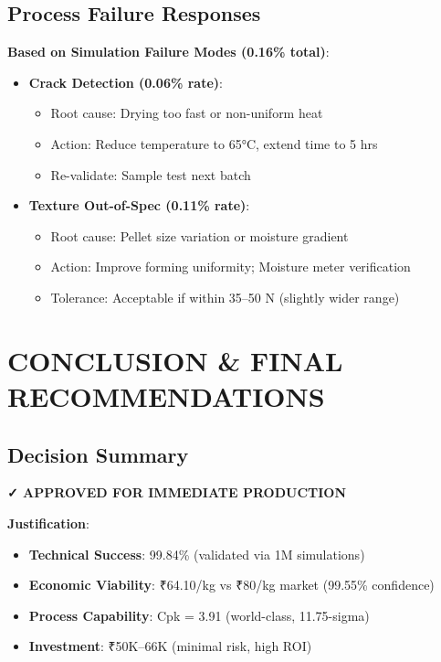\documentclass[12pt,a4paper]{article}
\begin{document}
\subsection{Process Failure Responses}

\textbf{Based on Simulation Failure Modes (0.16\% total)}:

\begin{itemize}
    \item \textbf{Crack Detection (0.06\% rate)}:
    \begin{itemize}
        \item Root cause: Drying too fast or non-uniform heat
        \item Action: Reduce temperature to 65°C, extend time to 5 hrs
        \item Re-validate: Sample test next batch
    \end{itemize}
    
    \item \textbf{Texture Out-of-Spec (0.11\% rate)}:
    \begin{itemize}
        \item Root cause: Pellet size variation or moisture gradient
        \item Action: Improve forming uniformity; Moisture meter verification
        \item Tolerance: Acceptable if within 35--50 N (slightly wider range)
    \end{itemize}
\end{itemize}

\section{CONCLUSION \& FINAL RECOMMENDATIONS}

\subsection{Decision Summary}

\begin{center}
\Large \textcolor{approvedgreen}{\textbf{✓ APPROVED FOR IMMEDIATE PRODUCTION}}
\end{center}

\textbf{Justification}:
\begin{itemize}
    \item \textbf{Technical Success}: 99.84\% (validated via 1M simulations)
    \item \textbf{Economic Viability}: ₹64.10/kg vs ₹80/kg market (99.55\% confidence)
    \item \textbf{Process Capability}: Cpk = 3.91 (world-class, 11.75-sigma)
    \item \textbf{Investment}: ₹50K--66K (minimal risk, high ROI)
\end{itemize}
\end{document}
